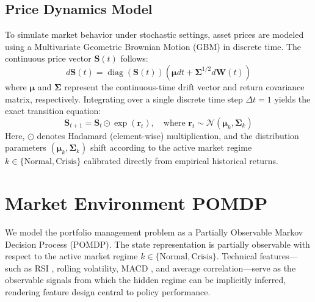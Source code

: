 \documentclass[pdflatex,sn-mathphys-num]{sn-jnl}
\begin{document}
\subsection{Price Dynamics Model}
To simulate market behavior under stochastic settings, asset prices are modeled using a Multivariate Geometric Brownian Motion (GBM) in discrete time. The continuous price vector $\mathbf{S}(t)$ follows:
\begin{equation}
    d\mathbf{S}(t) = \operatorname{diag}(\mathbf{S}(t)) \left( \boldsymbol{\mu} dt + \mathbf{\Sigma}^{1/2} d\mathbf{W}(t) \right)
\end{equation}
where $\boldsymbol{\mu}$ and $\mathbf{\Sigma}$ represent the continuous-time drift vector and return covariance matrix, respectively. Integrating over a single discrete time step $\Delta t = 1$ yields the exact transition equation:
\begin{equation}
    \mathbf{S}_{t+1} = \mathbf{S}_t \odot \exp(\mathbf{r}_t), \quad \text{where } \mathbf{r}_t \sim \mathcal{N}(\boldsymbol{\mu}_k, \mathbf{\Sigma}_k)
\end{equation}
Here, $\odot$ denotes Hadamard (element-wise) multiplication, and the distribution parameters $(\boldsymbol{\mu}_k, \mathbf{\Sigma}_k)$ shift according to the active market regime $k \in \{\text{Normal}, \text{Crisis}\}$ calibrated directly from empirical historical returns.

\section{Market Environment POMDP}
\label{sec:pomdp}

We model the portfolio management problem as a Partially Observable Markov Decision Process (POMDP). The state representation is partially observable with respect to the active market regime $k \in \{\text{Normal}, \text{Crisis}\}$. Technical features—such as RSI \cite{wilder1978new}, rolling volatility, MACD \cite{appel2005technical}, and average correlation—serve as the observable signals from which the hidden regime can be implicitly inferred, rendering feature design central to policy performance.
\end{document}
